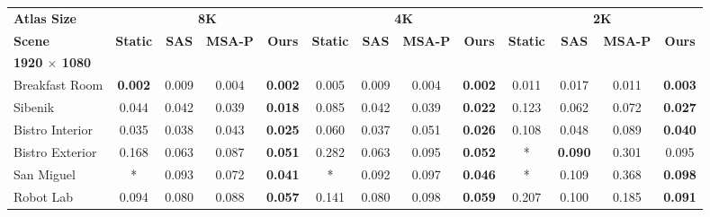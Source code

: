 \begin{table*}[t]
\scriptsize
\setlength{\tabcolsep}{3pt}
\centering
\begin{tabular}{l cccc|cccc|cccc}
\textbf{Atlas Size}           & \multicolumn{4}{c|}{\textbf{8K}} & \multicolumn{4}{c|}{\textbf{4K}}  & \multicolumn{4}{c}{\textbf{2K}}  \\
\textbf{Scene}                & \textbf{Static} & \textbf{SAS}   & \textbf{MSA-P} & \textbf{Ours}           & \textbf{Static} & \textbf{SAS}   & \textbf{MSA-P} & \textbf{Ours}           & \textbf{Static} & \textbf{SAS}   & \textbf{MSA-P} & \textbf{Ours}           \\
\hline
\textbf{1920 $\times$ 1080}   & & & & & & & & & & & & \\
Breakfast Room                & \textbf{0.002}  & 0.009          & 0.004          & \textbf{0.002}          & 0.005           & 0.009          & 0.004          & \textbf{0.002}          & 0.011           & 0.017          & 0.011          & \textbf{0.003}          \\
Sibenik                       & 0.044           & 0.042          & 0.039          & \textbf{0.018}          & 0.085           & 0.042          & 0.039          & \textbf{0.022}          & 0.123           & 0.062          & 0.072          & \textbf{0.027}          \\
Bistro Interior               & 0.035           & 0.038          & 0.043          & \textbf{0.025}          & 0.060           & 0.037          & 0.051          & \textbf{0.026}          & 0.108           & 0.048          & 0.089          & \textbf{0.040}          \\
Bistro Exterior               & 0.168           & 0.063          & 0.087          & \textbf{0.051}          & 0.282           & 0.063          & 0.095          & \textbf{0.052}          & *               & \textbf{0.090} & 0.301          & 0.095                   \\
San Miguel                    & *               & 0.093          & 0.072          & \textbf{0.041}          & *               & 0.092          & 0.097          & \textbf{0.046}          & *               & 0.109          & 0.368          & \textbf{0.098}          \\
Robot Lab                     & 0.094           & 0.080          & 0.088          & \textbf{0.057}          & 0.141           & 0.080          & 0.098          & \textbf{0.059}          & 0.207           & 0.100          & 0.185          & \textbf{0.091}          \\

\end{tabular}
\end{table*}
